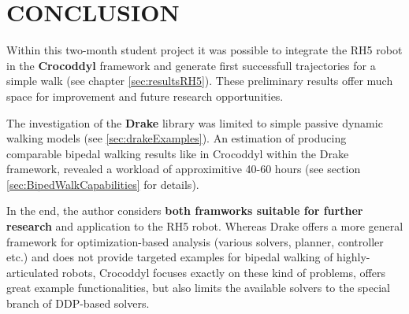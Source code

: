 \chapter{CONCLUSION}

Within this two-month student project it was possible to integrate the RH5 robot in the \textbf{Crocoddyl} framework and generate first successfull trajectories for a simple walk (see chapter \ref{sec:resultsRH5}). These preliminary results offer much space for improvement and future research opportunities.

The investigation of the \textbf{Drake} library was limited to simple passive dynamic walking models (see \ref{sec:drakeExamples}). An estimation of producing comparable bipedal walking results like in Crocoddyl within the Drake framework, revealed a workload of approximitive 40-60 hours (see section \ref{sec:BipedWalkCapabilities} for details). 

In the end, the author considers \textbf{both framworks suitable for further research} and application to the RH5 robot. 
Whereas Drake offers a more general framework for optimization-based analysis (various solvers, planner, controller etc.) and does not provide targeted examples for bipedal walking of highly-articulated robots, Crocoddyl focuses exactly on these kind of problems, offers great example functionalities, but also limits the available solvers to the special branch of DDP-based solvers.